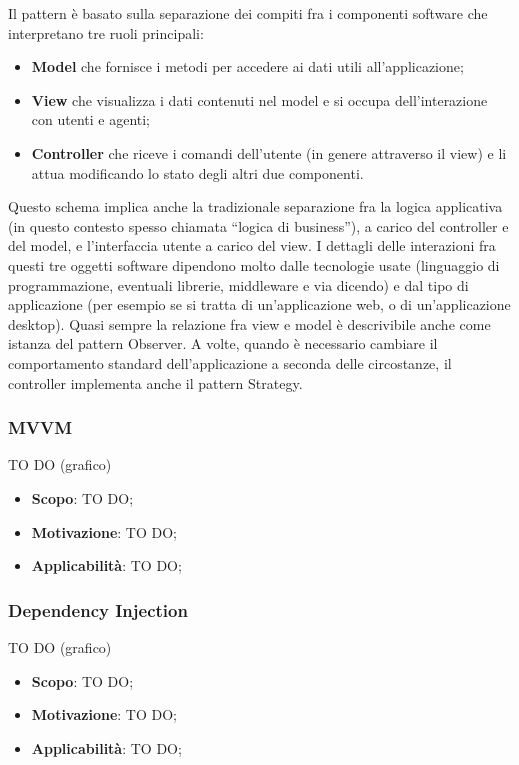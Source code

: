		Il pattern è basato sulla separazione dei compiti fra i componenti software che interpretano tre ruoli principali:
		\begin{itemize}
			\item \textbf{Model} che fornisce i metodi per accedere ai dati utili all'applicazione;
			\item \textbf{View} che visualizza i dati contenuti nel model e si occupa dell'interazione con utenti e agenti;
			\item \textbf{Controller} che riceve i comandi dell'utente (in genere attraverso il view) e li attua modificando lo stato degli altri due componenti.
		\end{itemize}
		\noindent
		Questo schema implica anche la tradizionale separazione fra la logica applicativa (in questo contesto spesso chiamata ``logica di business''), a carico del controller e del model, e l'interfaccia utente a carico del view. I dettagli delle interazioni fra questi tre oggetti software dipendono molto dalle tecnologie usate (linguaggio di programmazione, eventuali librerie, middleware e via dicendo) e dal tipo di applicazione (per esempio se si tratta di un'applicazione web, o di un'applicazione desktop). Quasi sempre la relazione fra view e model è descrivibile anche come istanza del pattern Observer. A volte, quando è necessario cambiare il comportamento standard dell'applicazione a seconda delle circostanze, il controller implementa anche il pattern Strategy.


		\subsubsection{MVVM} %
		TO DO (grafico)
		\begin{itemize}
			\item \textbf{Scopo}: TO DO;
			\item \textbf{Motivazione}: TO DO;
			\item \textbf{Applicabilità}: TO DO;
		\end{itemize}

		\subsubsection{Dependency Injection} %
		TO DO (grafico)
		\begin{itemize}
			\item \textbf{Scopo}: TO DO;
			\item \textbf{Motivazione}: TO DO;
			\item \textbf{Applicabilità}: TO DO;
		\end{itemize}

